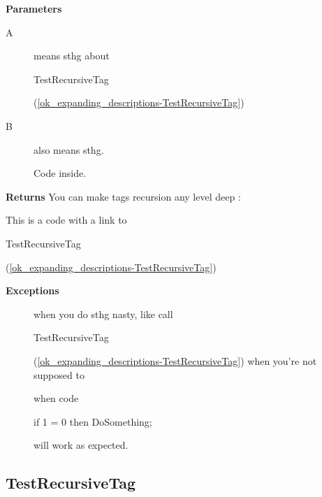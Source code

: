 \documentclass{report}
\newif\ifpdf
\begin{document}
\begin{list}{}
 \par
\item[\textbf{Parameters}]
\begin{description}
\item[A] means sthg about \begin{ttfamily}TestRecursiveTag\end{ttfamily}(\ref{ok_expanding_descriptions-TestRecursiveTag})
\item[B] also means sthg. \begin{ttfamily}Code inside.\end{ttfamily}
\end{description}
\item[\textbf{Returns}]You can make tags recursion any level deep : \begin{ttfamily}This is a code with a link to \begin{ttfamily}TestRecursiveTag\end{ttfamily}(\ref{ok_expanding_descriptions-TestRecursiveTag})\end{ttfamily}
\item[\textbf{Exceptions}]
\begin{description}
\item[\begin{ttfamily}EFoo\end{ttfamily}(\ref{ok_expanding_descriptions.EFoo})] when you do sthg nasty, like call \begin{ttfamily}TestRecursiveTag\end{ttfamily}(\ref{ok_expanding_descriptions-TestRecursiveTag}) when you're not supposed to
\item[\begin{ttfamily}EBar\end{ttfamily}(\ref{ok_expanding_descriptions.EBar})] when code \begin{ttfamily}if 1 = 0 then DoSomething;\end{ttfamily} will work as expected.
\end{description}


\end{list}
\ifpdf
\subsection*{\large{\textbf{TestRecursiveTag}}\normalsize\hspace{1ex}\hrulefill}
\else
\end{document}
